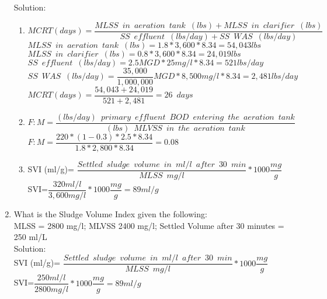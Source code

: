 \begin{enumerate}
Solution:\\
\vspace{0.3cm}
\begin{enumerate}
\item $MCRT (days) =  \dfrac{MLSS \enspace in \enspace aeration \enspace tank \enspace (lbs)+MLSS \enspace in \enspace clarifier \enspace (lbs)}{SS \enspace effluent \enspace (lbs/day)+SS \enspace WAS \enspace (lbs/day)}$\\
\vspace{0.3cm} 
$MLSS \enspace in \enspace aeration \enspace tank \enspace (lbs)=1.8*3,600*8.34=54,043lbs$\\
\vspace{0.3cm} 
$MLSS \enspace in \enspace clarifier \enspace (lbs)=0.8*3,600*8.34=24,019lbs$\\
\vspace{0.3cm} 
$SS \enspace effluent \enspace (lbs/day)=2.5MGD *25mg/l*8.34=521lbs/day$\\
\vspace{0.3cm} 
$SS \enspace WAS \enspace (lbs/day)=\dfrac{35,000}{1,000,000}MGD *8,500mg/l*8.34=2,481lbs/day$\\
\vspace{0.3cm} 
$MCRT (days) =  \dfrac{54,043+24,019}{521+2,481}=\boxed{26 \enspace days}$\\
\vspace{0.2cm}
\item $F:M=\dfrac{(lbs/day) \enspace primary \enspace effluent  \enspace BOD \enspace entering \enspace the  \enspace aeration \enspace tank}{(lbs) \enspace MLVSS \enspace in \enspace the  \enspace aeration \enspace tank}$\\
\vspace{0.3cm}
$F:M=\dfrac{220*(1-0.3)*2.5*8.34}{1.8*2,800*8.34}=\boxed{0.08}$\\
\vspace{0.25cm}

\item SVI (ml/g)= $\dfrac{Settled \enspace sludge \enspace volume \enspace in \enspace ml/l \enspace after \enspace 30 \enspace min}{MLSS \enspace mg/l}*1000 \dfrac{mg}{g}$\\
\vspace{0.25cm}
SVI=$\dfrac{320ml/l}{3,600mg/l}*1000\dfrac{mg}{g}=\boxed{89ml/g}$
\end{enumerate}

\item What is the Sludge Volume Index given the following:\\  MLSS = 2800 mg/l; MLVSS 2400 mg/l; Settled Volume after 30 minutes = 250 ml/L\\
\vspace{0.3cm} 
Solution:\\
SVI (ml/g)= $\dfrac{Settled \enspace sludge \enspace volume \enspace in \enspace ml/l \enspace after \enspace 30 \enspace min}{MLSS \enspace mg/l}*1000 \dfrac{mg}{g}$\\
\vspace{0.25cm}
SVI=$\dfrac{250ml/l}{2800mg/l}*1000\dfrac{mg}{g}=\boxed{89ml/g}$


\end{enumerate}
